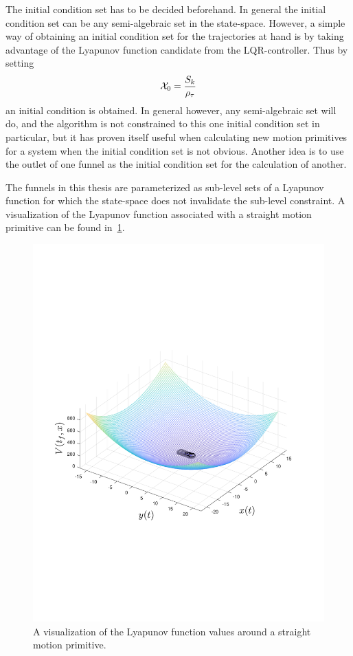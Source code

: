 The initial condition set has to be decided beforehand. In general the initial
condition set can be any semi-algebraic set in the state-space. However, a
simple way of obtaining an initial condition set for the trajectories at hand is
by taking advantage of the Lyapunov function candidate from the
\ac{LQR}-controller. Thus by setting
\begin{equation}
  \mathcal{X}_{0} = \frac{ S_{k}}{\rho_{\tau}}
\end{equation}
an initial condition is obtained. In general however, any semi-algebraic set
will do, and the algorithm is not constrained to this one initial condition set
in particular, but it has proven itself useful when calculating new motion
primitives for a system when the initial condition set is not obvious. Another
idea is to use the outlet of one funnel as the initial condition set for the
calculation of another.

The funnels in this thesis are parameterized as sub-level sets of a Lyapunov
function for which the state-space does not invalidate the sub-level constraint.
A visualization of the Lyapunov function associated with a straight motion
primitive can be found in~\cref{fig:visualized-lyapunov}.
\begin{figure}
  \centering \includegraphics[trim={3cm 7cm 3cm 7cm},
  scale=.6]{figures/rrtfunnel/straight-funnel-lyapunov-3d}
  \caption[The Lyapunov function visualized around a straight trajector]{A visualization of the Lyapunov function values around a straight
    motion primitive.}
  \label{fig:visualized-lyapunov}
\end{figure}

